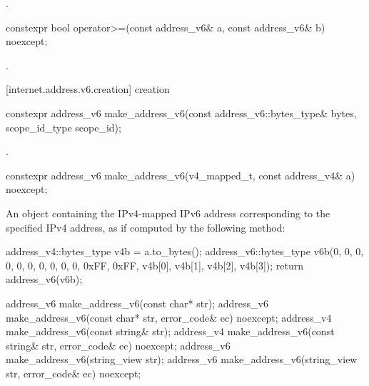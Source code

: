 \begin{itemdescr}
\pnum
\returns {}.
\end{itemdescr}

\begin{itemdecl}
constexpr bool operator>=(const address_v6& a, const address_v6& b) noexcept;
\end{itemdecl}

\begin{itemdescr}
\pnum
\returns {}.
\end{itemdescr}



[internet.address.v6.creation]{ creation}

\begin{itemdecl}
constexpr address_v6 make_address_v6(const address_v6::bytes_type& bytes,
                                     scope_id_type scope_id);
\end{itemdecl}

\begin{itemdescr}
\pnum
\returns {}.
\end{itemdescr}

\begin{itemdecl}
constexpr address_v6 make_address_v6(v4_mapped_t, const address_v4& a) noexcept;
\end{itemdecl}

\begin{itemdescr}
\pnum
\returns An  object containing the IPv4-mapped IPv6 address corresponding to the specified IPv4 address, as if computed by the following method: 
\begin{codeblock}
address_v4::bytes_type v4b = a.to_bytes();
address_v6::bytes_type v6b(0, 0, 0, 0, 0, 0, 0, 0, 0, 0,
                           0xFF, 0xFF, v4b[0], v4b[1], v4b[2], v4b[3]);
return address_v6(v6b);
\end{codeblock}

\end{itemdescr}

\begin{itemdecl}
address_v6 make_address_v6(const char* str);
address_v6 make_address_v6(const char* str, error_code& ec) noexcept;
address_v4 make_address_v6(const string& str);
address_v4 make_address_v6(const string& str, error_code& ec) noexcept;
address_v6 make_address_v6(string_view str);
address_v6 make_address_v6(string_view str, error_code& ec) noexcept;
\end{itemdecl}

